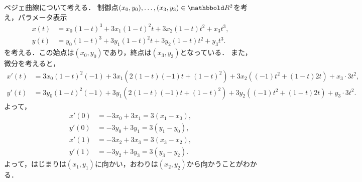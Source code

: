 \documentclass[9pt]{ltjsarticle}
\theoremstyle{break}
\theoremstyle{break}
\theoremstyle{break}
\theoremstyle{break}
\theoremstyle{break}
\theoremstyle{break}
\theoremstyle{break}
\theoremstyle{break}
\theoremstyle{break}
\theoremstyle{break}
\theoremstyle{break}
\theoremstyle{break}
\theoremstyle{break}
\theoremstyle{break}
\theoremstyle{break}
\theoremstyle{nonumberbreak}
\theoremstyle{nonumberbreak}
\begin{document}
ベジェ曲線について考える．
制御点$(x_0,y_0),\dots,(x_3,y_3) \in \R^2$を考え，パラメータ表示
\begin{align}
 x(t) &= x_0(1-t)^3 + 3x_1 (1-t)^2 t + 3x_2 (1-t)t^2 + x_3 t^3,\\
 y(t)& = y_0(1-t)^3 + 3y_1 (1-t)^2 t + 3y_2 (1-t)t^2 + y_3 t^3.
\end{align}
を考える．この始点は$(x_0,y_0)$であり，終点は$(x_3,y_3)$となっている．
また，微分を考えると，
\begin{align}
 x'(t) &= 3x_0 (1-t)^2 (-1) + 3x_1 (2(1-t)(-1)t + (1-t)^2) + 3x_2((-1)t^2 + (1-t)2t) + x_3\cdot 3t^2,\\
 y'(t)& =
3y_0(1-t)^2(-1) + 3y_1(2(1-t)(-1)t + (1-t)^2) + 3y_2((-1)t^2 + (1-t)2t) + y_3\cdot 3t^2.
\end{align}
よって，
\begin{align}
 x'(0) &= -3x_0 + 3x_1 = 3(x_1-x_0),\\
 y'(0)& = -3y_0 + 3y_1 = 3(y_1-y_0),\\
 x'(1) & = -3x_2 + 3x_3 = 3(x_3-x_2),\\
 y'(1)& = -3y_2 + 3y_3 = 3(y_3-y_2).
\end{align}
よって，はじまりは$(x_1,y_1)$に向かい，おわりは$(x_2,y_2)$から向かうことがわかる．
\end{document}
